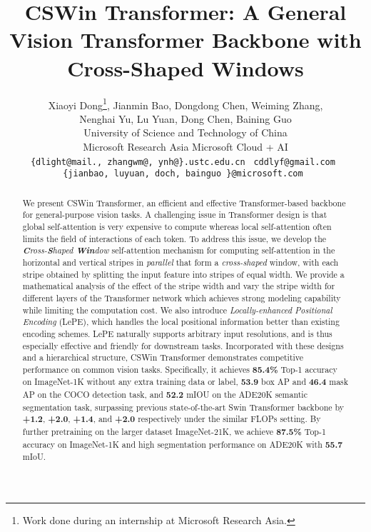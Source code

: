 \documentclass[10pt,twocolumn,letterpaper]{article}
\begin{document}
\title{CSWin Transformer: A General Vision Transformer Backbone with Cross-Shaped Windows}

\author{
Xiaoyi Dong\thanks{Work done during an internship at Microsoft Research Asia.},  Jianmin Bao, Dongdong Chen, Weiming Zhang,\\ Nenghai Yu, Lu Yuan, Dong Chen, Baining Guo \\
University of Science and Technology of China \\
Microsoft Research Asia
Microsoft Cloud + AI \\
{\tt\small\{dlight@mail., zhangwm@, ynh@\}.ustc.edu.cn } 
{\tt\small cddlyf@gmail.com }\\
{\tt\small\{jianbao, luyuan, doch, bainguo \}@microsoft.com } 
}

\maketitle

\begin{abstract}
   We present CSWin Transformer, an efficient and effective Transformer-based backbone for general-purpose vision tasks.
A challenging issue in Transformer design is that global self-attention is very expensive to compute whereas local self-attention often limits the field of interactions of each token. To address this issue, we develop the \emph{\textbf{C}ross-\textbf{S}haped \textbf{Win}dow} self-attention mechanism for computing self-attention in the horizontal and vertical stripes in \emph{parallel} that form a \emph{cross-shaped} window, with each stripe obtained by splitting the input feature into stripes of equal width. 
We provide a mathematical analysis of the effect of the stripe width and vary the stripe width for different layers of the Transformer network which achieves strong modeling capability while limiting the computation cost.
We also introduce \emph{Locally-enhanced Positional Encoding} (LePE), which handles the local positional information better than existing encoding schemes. LePE naturally supports arbitrary input resolutions, and is thus especially effective and friendly for downstream tasks. 
Incorporated with these designs and a hierarchical structure, CSWin Transformer demonstrates competitive performance on common vision tasks.
Specifically, it achieves \textbf{85.4\%} Top-1 accuracy on ImageNet-1K without any extra training data or label, \textbf{53.9} box AP and \textbf{46.4} mask AP on the COCO detection task, and \textbf{52.2} mIOU on the ADE20K semantic segmentation task, surpassing previous state-of-the-art Swin Transformer backbone by \textbf{+1.2}, \textbf{+2.0}, \textbf{+1.4}, and \textbf{+2.0} respectively under the similar FLOPs setting. By further pretraining on the larger dataset ImageNet-21K, we achieve \textbf{87.5\%} Top-1 accuracy on ImageNet-1K and high segmentation performance on ADE20K with \textbf{55.7} mIoU. 
\end{abstract}
\vspace{-4mm}
\end{document}
